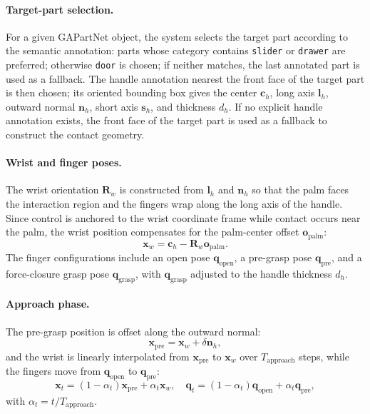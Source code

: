 \paragraph{Target-part selection.}
For a given GAPartNet object, the system selects the target part
according to the semantic annotation: parts whose category contains
\texttt{slider} or \texttt{drawer} are preferred; otherwise
\texttt{door} is chosen; if neither matches, the last annotated part
is used as a fallback. The handle annotation nearest the front face
of the target part is then chosen; its oriented bounding box gives the
center $\mathbf{c}_h$, long axis $\mathbf{l}_h$, outward normal
$\mathbf{n}_h$, short axis $\mathbf{s}_h$, and thickness $d_h$. If
no explicit handle annotation exists, the front face of the target
part is used as a fallback to construct the contact geometry.

\paragraph{Wrist and finger poses.}
The wrist orientation $\mathbf{R}_w$ is constructed from
$\mathbf{l}_h$ and $\mathbf{n}_h$ so that the palm faces the
interaction region and the fingers wrap along the long axis of the
handle. Since control is anchored to the wrist coordinate frame
while contact occurs near the palm, the wrist position compensates
for the palm-center offset $\mathbf{o}_{\mathrm{palm}}$:
\begin{equation}
\mathbf{x}_w = \mathbf{c}_h - \mathbf{R}_w \mathbf{o}_{\mathrm{palm}}.
\end{equation}
The finger configurations include an open pose
$\mathbf{q}_{\mathrm{open}}$, a pre-grasp pose
$\mathbf{q}_{\mathrm{pre}}$, and a force-closure grasp pose
$\mathbf{q}_{\mathrm{grasp}}$, with $\mathbf{q}_{\mathrm{grasp}}$
adjusted to the handle thickness $d_h$.

\paragraph{Approach phase.}
The pre-grasp position is offset along the outward normal:
\begin{equation}
\mathbf{x}_{\mathrm{pre}} = \mathbf{x}_w + \delta \mathbf{n}_h,
\end{equation}
and the wrist is linearly interpolated from $\mathbf{x}_{\mathrm{pre}}$
to $\mathbf{x}_w$ over $T_{\mathrm{approach}}$ steps, while the
fingers move from $\mathbf{q}_{\mathrm{open}}$ to
$\mathbf{q}_{\mathrm{pre}}$:
\begin{equation}
\mathbf{x}_t = (1-\alpha_t)\mathbf{x}_{\mathrm{pre}}
+ \alpha_t \mathbf{x}_w,\quad
\mathbf{q}_t = (1-\alpha_t)\mathbf{q}_{\mathrm{open}}
+ \alpha_t \mathbf{q}_{\mathrm{pre}},
\end{equation}
with $\alpha_t = t/T_{\mathrm{approach}}$.


